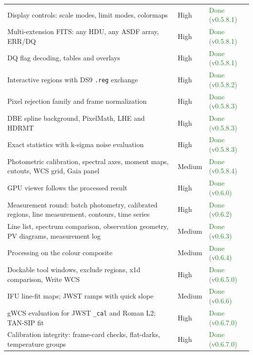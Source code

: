 \documentclass[11pt,a4paper]{article}
\newcommand{\code}[1]{\texttt{\small #1}}
\begin{document}
\begin{longtable}{>{\raggedright\arraybackslash}p{8.4cm}ll}
            Display controls: scale modes, limit modes, colormaps & High & \textcolor{ForestGreen}{Done (v0.5.8.1)} \\
            Multi-extension FITS: any HDU, any ASDF array, ERR/DQ & High & \textcolor{ForestGreen}{Done (v0.5.8.1)} \\
            DQ flag decoding, tables and overlays & High & \textcolor{ForestGreen}{Done (v0.5.8.1)} \\
            Interactive regions with DS9 \code{.reg} exchange & High & \textcolor{ForestGreen}{Done (v0.5.8.2)} \\
            Pixel rejection family and frame normalization & High & \textcolor{ForestGreen}{Done (v0.5.8.3)} \\
            DBE spline background, PixelMath, LHE and HDRMT & High & \textcolor{ForestGreen}{Done (v0.5.8.3)} \\
            Exact statistics with k-sigma noise evaluation & High & \textcolor{ForestGreen}{Done (v0.5.8.3)} \\
            Photometric calibration, spectral axes, moment maps, cutouts, WCS grid, Gaia panel & Medium & \textcolor{ForestGreen}{Done (v0.5.8.4)} \\
            GPU viewer follows the processed result & High & \textcolor{ForestGreen}{Done (v0.6.0)} \\
            Measurement round: batch photometry, calibrated regions, line measurement, contours, time series & High & \textcolor{ForestGreen}{Done (v0.6.2)} \\
            Line list, spectrum comparison, observation geometry, PV diagrams, measurement log & Medium & \textcolor{ForestGreen}{Done (v0.6.3)} \\
            Processing on the colour composite & Medium & \textcolor{ForestGreen}{Done (v0.6.4)} \\
            Dockable tool windows, exclude regions, x1d comparison, Write WCS & High & \textcolor{ForestGreen}{Done (v0.6.5.0)} \\
            IFU line-fit maps; JWST ramps with quick slope & Medium & \textcolor{ForestGreen}{Done (v0.6.6)} \\
            gWCS evaluation for JWST \code{\_cal} and Roman L2; TAN-SIP fit & High & \textcolor{ForestGreen}{Done (v0.6.7.0)} \\
            Calibration integrity: frame-card checks, flat-darks, temperature groups & High & \textcolor{ForestGreen}{Done (v0.6.7.0)} \\

\end{longtable}
\end{document}

